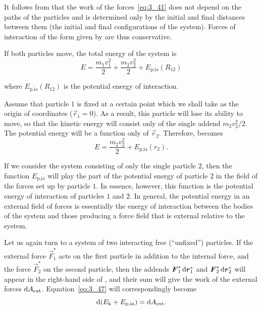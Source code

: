 \noindent
It follows from  that the work of the forces~\eqref{eq:3_41} does not depend on the paths of the particles and is determined only by the initial and final distances between them (the initial and final configurations of the system). Forces of interaction of the form given by  are thus conservative.

If both particles move, the total energy of the system is
\begin{equation}\label{eq:3_49}
E = \frac{m_1v_1^2}{2} + \frac{m_2v_2^2}{2} + E_{\text{p,ia}}(R_{12})
\end{equation}

\noindent
where $E_{\text{p,ia}}(R_{12})$ is the potential energy of interaction.

Assume that particle $1$ is fixed at a certain point which we shall take as the origin of coordinates ($\vec{r}_1=0$). As a result, this particle will lose its ability to move, so that the kinetic energy will consist only of the single addend $m_2v_2^2/2$. The potential energy will be a function only of $\vec{r}_2$. Therefore,  becomes
\begin{equation}\label{eq:3_50}
E = \frac{m_2v_2^2}{2} + E_{\text{p,ia}}(r_2).
\end{equation}

\noindent
If we consider the system consisting of only the single particle $2$, then the function $E_{\text{p,ia}}$ will play the part of the potential energy of particle $2$ in the field of the forces set up by particle $1$. In essence, however, this function is the potential energy of interaction of particles $1$ and $2$. In general, the potential energy in an external field of forces is essentially the energy of interaction between the bodies of the system and those producing a force field that is external relative to the system.

Let us again turn to a system of two interacting free (``unfixed'') particles. If the external force $\vec{F}_1^*$ acts on the first particle in addition to the internal force, and the force $\vec{F}_2^*$ on the second particle, then the addends $\boldsymbol{F}_1^*\,\mathrm{d}\boldsymbol{r}_1^*$ and $\boldsymbol{F}_2^*\,\mathrm{d}\boldsymbol{r}_2^*$ will appear in the right-hand side of , and their sum will give the work of the external forces $\mathrm{d} A_{\text{ext}}$. Equation~\eqref{eq:3_47} will correspondingly become
\begin{equation}\label{eq:3_51}
\mathrm{d}(E_{\text{k}}+E_{\text{p,ia}}) = \mathrm{d} A_{\text{ext}}.
\end{equation}

